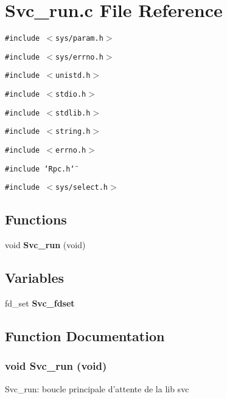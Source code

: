 \section{Svc\_\-run.c File Reference}
\label{Svc__run_8c}
{\tt \#include $<$sys/param.h$>$}\par
{\tt \#include $<$sys/errno.h$>$}\par
{\tt \#include $<$unistd.h$>$}\par
{\tt \#include $<$stdio.h$>$}\par
{\tt \#include $<$stdlib.h$>$}\par
{\tt \#include $<$string.h$>$}\par
{\tt \#include $<$errno.h$>$}\par
{\tt \#include \char`\"{}Rpc.h\char`\"{}}\par
{\tt \#include $<$sys/select.h$>$}\par
\subsection*{Functions}
\begin{CompactItemize}
\item 
void {\bf Svc\_\-run} (void)
\end{CompactItemize}
\subsection*{Variables}
\begin{CompactItemize}
\item 
fd\_\-set {\bf Svc\_\-fdset}
\end{CompactItemize}


\subsection{Function Documentation}
\subsubsection{\setlength{\rightskip}{0pt plus 5cm}void Svc\_\-run (void)}\label{Svc__run_8c_a1}


Svc\_\-run: boucle principale d'attente de la lib svc

